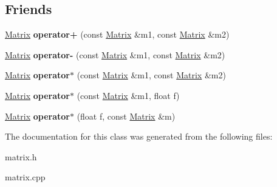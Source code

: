 \subsection*{\-Friends}
\begin{DoxyCompactItemize}
\item 
\hypertarget{classMatrix_aa5a9f2db2b3c1862c9c0d19241239ce7}{\hyperlink{classMatrix}{\-Matrix} {\bfseries operator+} (const \hyperlink{classMatrix}{\-Matrix} \&m1, const \hyperlink{classMatrix}{\-Matrix} \&m2)}\label{classMatrix_aa5a9f2db2b3c1862c9c0d19241239ce7}

\item 
\hypertarget{classMatrix_a52ad5ef4b9998529c85e8523c20d6b86}{\hyperlink{classMatrix}{\-Matrix} {\bfseries operator-\/} (const \hyperlink{classMatrix}{\-Matrix} \&m1, const \hyperlink{classMatrix}{\-Matrix} \&m2)}\label{classMatrix_a52ad5ef4b9998529c85e8523c20d6b86}

\item 
\hypertarget{classMatrix_a24da5fd1a21f5010ee32de71af9be3b9}{\hyperlink{classMatrix}{\-Matrix} {\bfseries operator$\ast$} (const \hyperlink{classMatrix}{\-Matrix} \&m1, const \hyperlink{classMatrix}{\-Matrix} \&m2)}\label{classMatrix_a24da5fd1a21f5010ee32de71af9be3b9}

\item 
\hypertarget{classMatrix_a895d86a3588e50c3aa51f0e43b43de39}{\hyperlink{classMatrix}{\-Matrix} {\bfseries operator$\ast$} (const \hyperlink{classMatrix}{\-Matrix} \&m1, float f)}\label{classMatrix_a895d86a3588e50c3aa51f0e43b43de39}

\item 
\hypertarget{classMatrix_a900892d8498953af4e4606741601c017}{\hyperlink{classMatrix}{\-Matrix} {\bfseries operator$\ast$} (float f, const \hyperlink{classMatrix}{\-Matrix} \&m)}\label{classMatrix_a900892d8498953af4e4606741601c017}

\end{DoxyCompactItemize}


\-The documentation for this class was generated from the following files\-:\begin{DoxyCompactItemize}
\item 
matrix.\-h\item 
matrix.\-cpp\end{DoxyCompactItemize}
